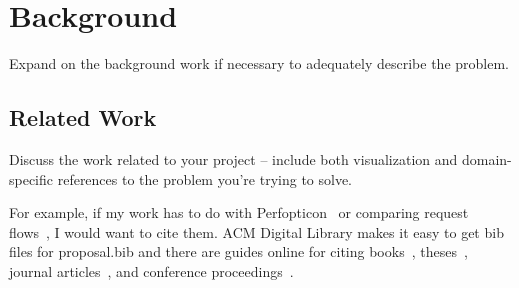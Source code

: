 \section{Background}
\label{sec:background}

Expand on the background work if necessary to adequately describe the
problem.

\subsection{Related Work}
\label{sec:related}

Discuss the work related to your project -- include both visualization and
domain-specific references to the problem you're trying to solve.

For example, if my work has to do with Perfopticon~\cite{Moritz:2015:EuroVis}
or comparing request flows~\cite{Sambasivan:2013:InfoVis}, I would want to
cite them. ACM Digital Library makes it easy to get bib files for
proposal.bib and there are guides online for citing
books~\cite{ware:2004:IVP}, theses~\cite{levoy:1989:DSV}, journal
articles~\cite{Lorensen:1987:MCA}, and conference
proceedings~\cite{Nielson:1991:TAD}.

